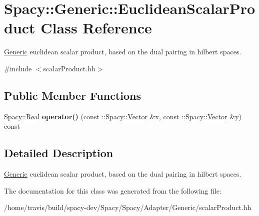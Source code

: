 \hypertarget{classSpacy_1_1Generic_1_1EuclideanScalarProduct}{\section{\-Spacy\-:\-:\-Generic\-:\-:\-Euclidean\-Scalar\-Product \-Class \-Reference}
\label{classSpacy_1_1Generic_1_1EuclideanScalarProduct}
}


\hyperlink{namespaceSpacy_1_1Generic}{\-Generic} euclidean scalar product, based on the dual pairing in hilbert spaces.  




{\ttfamily \#include $<$scalar\-Product.\-hh$>$}

\subsection*{\-Public \-Member \-Functions}
\begin{DoxyCompactItemize}
\item 
\hypertarget{classSpacy_1_1Generic_1_1EuclideanScalarProduct_a7aa8a7d9b912b0a72386317435897f81}{\hyperlink{classSpacy_1_1Real}{\-Spacy\-::\-Real} {\bfseries operator()} (const \-::\hyperlink{classSpacy_1_1Vector}{\-Spacy\-::\-Vector} \&x, const \-::\hyperlink{classSpacy_1_1Vector}{\-Spacy\-::\-Vector} \&y) const }\label{classSpacy_1_1Generic_1_1EuclideanScalarProduct_a7aa8a7d9b912b0a72386317435897f81}

\end{DoxyCompactItemize}


\subsection{\-Detailed \-Description}
\hyperlink{namespaceSpacy_1_1Generic}{\-Generic} euclidean scalar product, based on the dual pairing in hilbert spaces. 

\-The documentation for this class was generated from the following file\-:\begin{DoxyCompactItemize}
\item 
/home/travis/build/spacy-\/dev/\-Spacy/\-Spacy/\-Adapter/\-Generic/scalar\-Product.\-hh\end{DoxyCompactItemize}
